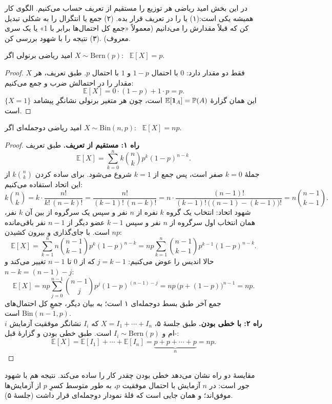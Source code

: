 در این بخش امید ریاضی هر توزیع را مستقیم از تعریف حساب می‌کنیم. الگوی کار همیشه یکی است:\newline (۱)  یا  را در تعریف قرار بده. \newline (۲) جمع یا انتگرال را به شکلی تبدیل کن که قبلاً مقدارش را می‌دانیم (معمولاً «جمع کل احتمال‌ها برابر با 1» یا یک سری معروف) .\newline (۳) نتیجه را با شهود بررسی کن.

\begin{proposition}[label=prop:E-bern]{امید ریاضی برنولی}
  اگر $X\sim\mathrm{Bern}(p)$: \ $\mathbb E[X]=p$.
\end{proposition}
\begin{proof}
  $X$ فقط دو مقدار دارد: $0$ با احتمال $1-p$ و $1$ با احتمال $p$. طبق تعریف، هر مقدار را در احتمالش ضرب و جمع می‌کنیم:
  \[ \mathbb E[X]=0\cdot(1-p)+1\cdot p=p. \]
  این همان گزارهٔ $\mathbb E[\mathbf{1}_A]=\mathbb{P}(A)$ است، چون هر متغیر برنولی نشانگرِ پیشامد $\{X=1\}$ است.
\end{proof}

\begin{proposition}[label=prop:E-bin]{امید ریاضی دوجمله‌ای}
  اگر $X\sim\mathrm{Bin}(n,p)$: \ $\mathbb E[X]=np$.
\end{proposition}
\begin{proof}
  \textbf{راه ۱: مستقیم از تعریف.} طبق تعریف
  \[ \mathbb E[X]=\sum_{k=0}^{n}k\binom nkp^k(1-p)^{n-k}. \]
  جملهٔ $k=0$ صفر است، پس جمع از $k=1$ شروع می‌شود. برای ساده کردن $k\binom nk$ از این اتحاد استفاده می‌کنیم:
  \[ k\binom nk=k\cdot\frac{n!}{k!\,(n-k)!}=\frac{n!}{(k-1)!\,(n-k)!}=n\cdot\frac{(n-1)!}{(k-1)!\,\bigl((n-1)-(k-1)\bigr)!}=n\binom{n-1}{k-1}. \]
  شهود اتحاد: انتخاب یک گروه $k$ نفره از $n$ نفر و سپس یک سرگروه از بین آن $k$ نفر، همان انتخاب اول سرگروه از $n$ نفر و سپس $k-1$ عضو دیگر از $n-1$ نفر باقی‌مانده است. \newline با جای‌گذاری و بیرون کشیدن $np$:
  \[ \mathbb E[X]=\sum_{k=1}^{n}n\binom{n-1}{k-1}p^k(1-p)^{n-k}=np\sum_{k=1}^{n}\binom{n-1}{k-1}p^{k-1}(1-p)^{n-k}. \]
  حالا اندیس را عوض می‌کنیم: $j=k-1$ که از $0$ تا $n-1$ تغییر می‌کند و $n-k=(n-1)-j$:
  \[ \mathbb E[X]=np\sum_{j=0}^{n-1}\binom{n-1}{j}p^{j}(1-p)^{(n-1)-j}=np\,\bigl(p+(1-p)\bigr)^{n-1}=np. \]
  جمع آخر طبق بسط دوجمله‌ای ۱ است؛ به بیان دیگر، جمعِ کل احتمال‌های $\mathrm{Bin}(n-1,p)$ است.\\[3pt]
  \textbf{راه ۲: با خطی بودن.} طبق جلسهٔ ۵، $X=I_1+\cdots+I_n$ که $I_i$ نشانگر موفقیت آزمایش $i$-ام و $I_i\sim\mathrm{Bern}(p)$ است. طبق خطی بودن و گزارهٔ قبل:
  \[ \mathbb E[X]=\mathbb E[I_1]+\cdots+\mathbb E[I_n]=\underbrace{p+p+\cdots+p}_{n}=np. \]
\end{proof}
مقایسهٔ دو راه نشان می‌دهد خطی بودن چقدر کار را ساده می‌کند. نتیجه هم با شهود جور است: در $n$ آزمایش با احتمال موفقیت $p$، به طور متوسط کسرِ $p$ از آزمایش‌ها موفق‌اند؛ و همان جایی است که قلهٔ نمودار دوجمله‌ای قرار داشت (جلسهٔ ۵).

